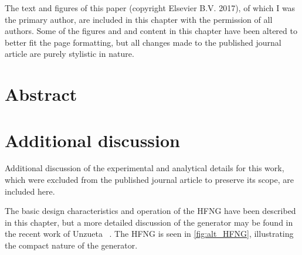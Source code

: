 \vspace{0.5cm}



The text and figures of this paper (copyright Elsevier B.V. 2017), of which I was the primary author, are
included in this chapter with the permission of all authors. 
Some of the figures and and content in this chapter have been altered to better fit the page formatting, but all changes made to the published journal article are purely stylistic in nature.


% 



% 
% 
\section{Abstract}



% 
% 




%
% 
\section{Additional discussion} \label{sec:extra_np}

Additional discussion of the experimental and analytical details for this work, which were excluded from the published journal article to preserve its scope, are included here.



The basic design characteristics and operation of the HFNG have been described in this chapter, but a more detailed discussion of the generator may be found in the recent work of Unzueta \etal\ \cite{ayllon2018design}. 
The HFNG is seen in  \autoref{fig:alt_HFNG}, illustrating the compact nature of the generator.



